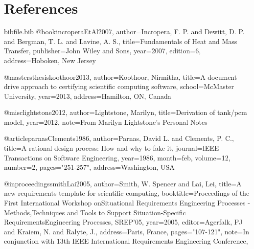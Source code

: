 \documentclass[12pt]{article}
\begin{document}
\section{References}
\label{Sec:References}
\begin{filecontents*}{bibfile.bib}
@book{incroperaEtAl2007,
author={Incropera, F. P. and Dewitt, D. P. and Bergman, T. L. and Lavine, A. S.},
title={Fundamentals of Heat and Mass Transfer},
publisher={John Wiley and Sons},
year={2007},
edition={6},
address={Hoboken, New Jersey}}

@mastersthesis{koothoor2013,
author={Koothoor, Nirmitha},
title={A document drive approach to certifying scientific computing software},
school={McMaster University},
year={2013},
address={Hamilton, ON, Canada}}

@misc{lightstone2012,
author={Lightstone, Marilyn},
title={Derivation of tank/pcm model},
year={2012},
note={From Marilyn Lightstone's Personal Notes}}

@article{parnasClements1986,
author={Parnas, David L. and Clements, P. C.},
title={A rational design process: How and why to fake it},
journal={IEEE Transactions on Software Engineering},
year={1986},
month={feb},
volume={12},
number={2},
pages={"251-257"},
address={Washington, USA}}

@inproceedings{smithLai2005,
author={Smith, W. Spencer and Lai, Lei},
title={A new requirements template for scientific computing},
booktitle={Proceedings of the First International Workshop onSituational Requirements Engineering Processes - Methods,Techniques and Tools to Support Situation-Specific RequirementsEngineering Processes, SREP'05},
year={2005},
editor={Agerfalk, PJ and Kraiem, N. and Ralyte, J.},
address={Paris, France},
pages={"107-121"},
note={In conjunction with 13th IEEE International Requirements Engineering Conference,}}
\end{filecontents*}
\nocite{*}
\printbibliography[heading=none]
\end{document}
